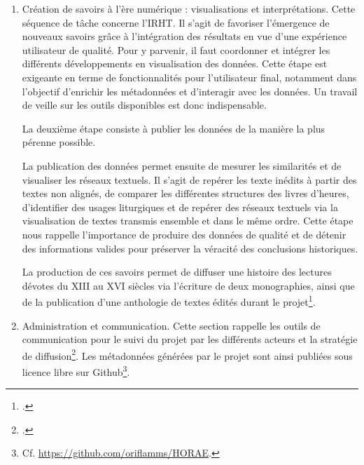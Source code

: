 \documentclass[a4paper,12pt,twoside]{book}
\begin{document}
\begin{enumerate}
	    Enfin, comme pour les grandes étapes précédentes, cette tâche se conclut par la création d'une interface de visualisation qui permette de valider les alignements de textes élémentaires détectés\footcite[p. 14-15]{HORAE_projet}. \\
	    
	    \item \og Création de savoirs à l'ère numérique : visualisations et interprétations\fg{}. Cette séquence de tâche concerne l'IRHT. Il s'agit de favoriser l'émergence de nouveaux savoirs grâce à l'intégration des résultats en vue d'une expérience utilisateur de qualité. Pour y parvenir, il faut coordonner et intégrer les différents développements en visualisation des données. Cette étape est exigeante en terme de fonctionnalités pour l'utilisateur final, notamment dans l'objectif d'enrichir les métadonnées et d'interagir avec les données. Un travail de veille sur les outils disponibles est donc indispensable. 
	    
	    La deuxième étape consiste à publier les données de la manière la plus pérenne possible. 
	    
	    La publication des données permet ensuite de mesurer les similarités et de visualiser les réseaux textuels. Il s'agit de repérer les texte inédits à partir des textes non alignés, de comparer les différentes structures des livres d'heures, d'identifier des usages liturgiques et de repérer des réseaux textuels via la visualisation de textes transmis ensemble et dans le même ordre. Cette étape nous rappelle l'importance de produire des données de qualité et de détenir des informations valides pour préserver la véracité des conclusions historiques. 
	    
	    La production de ces savoirs permet de diffuser une histoire des lectures dévotes du \textsc{XIII} au \textsc{XVI} siècles via l'écriture de deux monographies, ainsi que de la publication d'une anthologie de textes édités durant le projet\footcite[p. 15-16]{HORAE_projet}. \\
	    
	    \item \og Administration et communication\fg{}. Cette section rappelle les outils de communication pour le suivi du projet par les différents acteurs et la stratégie de diffusion\footcite[p. 16-17]{HORAE_projet}. Les métadonnées générées par le projet sont ainsi publiées sous licence libre sur Github\footnote{Cf. \url{https://github.com/oriflamms/HORAE}.}.\\
	    	\end{enumerate}
	    
\end{document}
